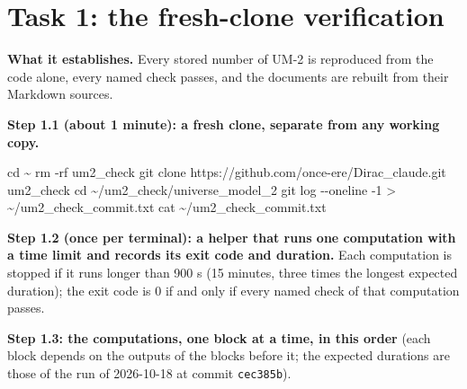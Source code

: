 \documentclass[
  10pt,
]{article}
\newenvironment{Shaded}{}{}
\newcommand{\NormalTok}[1]{#1}
\begin{document}
\hypertarget{task-1-the-fresh-clone-verification}{%
\section{Task 1: the fresh-clone
verification}\label{task-1-the-fresh-clone-verification}}

\textbf{What it establishes.} Every stored number of UM-2 is reproduced
from the code alone, every named check passes, and the documents are
rebuilt from their Markdown sources.

\textbf{Step 1.1 (about 1 minute): a fresh clone, separate from any
working copy.}

\begin{Shaded}
\begin{Highlighting}[]
\NormalTok{cd \textasciitilde{}}
\NormalTok{rm {-}rf um2\_check}
\NormalTok{git clone https://github.com/once{-}ere/Dirac\_claude.git um2\_check}
\NormalTok{cd \textasciitilde{}/um2\_check/universe\_model\_2}
\NormalTok{git log {-}{-}oneline {-}1 \textgreater{} \textasciitilde{}/um2\_check\_commit.txt}
\NormalTok{cat \textasciitilde{}/um2\_check\_commit.txt}
\end{Highlighting}
\end{Shaded}

\textbf{Step 1.2 (once per terminal): a helper that runs one computation
with a time limit and records its exit code and duration.} Each
computation is stopped if it runs longer than 900 s (15 minutes, three
times the longest expected duration); the exit code is 0 if and only if
every named check of that computation passes.

\begin{Shaded}
\end{Shaded}

\textbf{Step 1.3: the computations, one block at a time, in this order}
(each block depends on the outputs of the blocks before it; the expected
durations are those of the run of 2026-10-18 at commit
\texttt{cec385b}).
\end{document}

